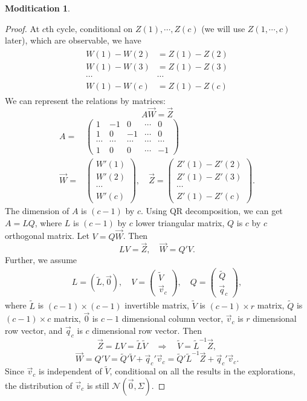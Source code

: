 \documentclass{article}
\theoremstyle{plain}
\theoremstyle{definition}
\newtheorem{modification}{Moditication}
\begin{document}
\begin{modification}
\begin{proof}
At $c$th cycle, conditional on $Z(1), \cdots, Z(c)$ (we will use $Z(1,\cdots, c)$ later), which are observable, we have
\begin{align*}
\begin{array}{ll}
W(1)-W(2)&=Z(1)-Z(2)\\
W(1)-W(3)&=Z(1)-Z(3)\\
\cdots &\cdots\\
W(1)-W(c)&=Z(1)-Z(c)
\end{array}
\end{align*}
We can represent the relations by matrices:
\[A\vec{W}=\vec{Z}\]
\begin{align*}
A=&\left(
\begin{array}{ccccc}
1&-1&0&\cdots&0\\
1&0&-1&\cdots&0\\
\cdots&\cdots&\cdots&\cdots&\cdots\\
1&0&0&\cdots&-1
\end{array}\right)\\
\vec{W}=&\left(\begin{array}{c}W'(1)\\W'(2)\\ \cdots \\ W'(c)\end{array}\right),\quad \vec{Z}=\left(\begin{array}{c}
Z'(1)-Z'(2)\\
Z'(1)-Z'(3)\\
\cdots\\
Z'(1)-Z'(c)
\end{array}\right).
\end{align*}
The dimension of $A$ is $(c-1)$ by $c$. Using QR decomposition, we can get $A=LQ$, where $L$ is $(c-1)$ by $c$ lower triangular matrix, $Q$ is $c$ by $c$ orthogonal matrix. Let ${V}=Q\vec{W}$. Then 
\[L{V}=\vec{Z},\quad \vec{W}=Q'V.\]
Further, we assume
\begin{align*}
L=(\tilde{L},\vec{0}),\quad {V}=\left(\begin{array}{c}\tilde{V}\\\vec{v}_c\end{array}\right),\quad Q=\left(\begin{array}{c}\tilde{Q}\\\vec{q}_c\end{array}\right),
\end{align*}
where $\tilde{L}$ is $(c-1)\times (c-1)$ invertible matrix, $\tilde{V}$ is $(c-1)\times r$ matrix, $\tilde{Q}$ is $(c-1)\times c$ matrix, $\vec{0}$ is $c-1$ dimensional column vector, $\vec{v}_c$ is $r$ dimensional row vector, and $\vec{q}_c$ is $c$ dimensional row vector. Then
\[\vec{Z}=LV = \tilde{L}\tilde{V} \quad \Rightarrow \quad \tilde{V}=\tilde{L}^{-1}\vec{Z},\]
\[\vec{W}=Q'V=\tilde{Q}'\tilde{V}+\vec{q}_c'\vec{v}_c=\tilde{Q}'\tilde{L}^{-1}\vec{Z}+\vec{q}_c'\vec{v}_c.\]
Since $\vec{v}_c$ is independent of $\tilde{V}$, conditional on all the results in the explorations, the distribution of $\vec{v}_c$ is still $\mathcal{N}(\vec{0},\Sigma)$.


\end{proof}
\end{modification}
\end{document}
